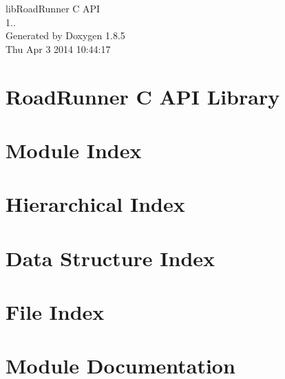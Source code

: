 \documentclass[twoside]{book}
\newcommand{\clearemptydoublepage}{%
  \newpage{\pagestyle{empty}\cleardoublepage}%
}
\begin{document}
\hypersetup{pageanchor=false}
\begin{titlepage}
\vspace*{7cm}
\begin{center}%
{\Large lib\-Road\-Runner C A\-P\-I \\[1ex]\large 1.. }\\
\vspace*{1cm}
{\large Generated by Doxygen 1.8.5}\\
\vspace*{0.5cm}
{\small Thu Apr 3 2014 10:44:17}\\
\end{center}
\end{titlepage}
\clearemptydoublepage
\tableofcontents
\clearemptydoublepage
{}
\hypersetup{pageanchor=true}

\chapter{Road\-Runner C A\-P\-I Library}
\label{index}\hypertarget{index}{}
\chapter{Module Index}

\chapter{Hierarchical Index}

\chapter{Data Structure Index}

\chapter{File Index}

\chapter{Module Documentation}
























\end{document}
